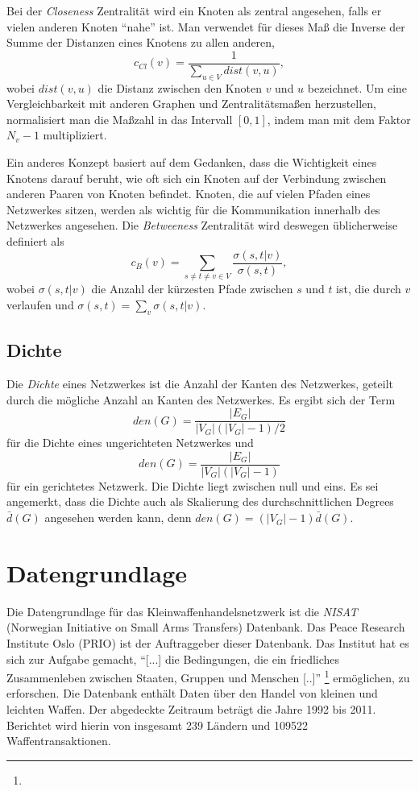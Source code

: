 \documentclass[a4paper,ngerman,oneside,titlepage,bibliography=totoc,11pt]{scrreprt}
\begin{document}
Bei der \emph{Closeness} Zentralität wird ein Knoten als zentral angesehen, falls er vielen anderen Knoten "`nahe"' ist.
Man verwendet für dieses Maß die Inverse der Summe der Distanzen eines Knotens zu allen anderen,
$$ c_{Cl}(v)=\frac{1}{\sum_{u \in V}{dist(v,u)}}, $$
wobei $dist(v,u)$ die Distanz zwischen den Knoten $v$ und $u$ bezeichnet. Um eine Vergleichbarkeit mit anderen Graphen und Zentralitätsmaßen herzustellen, normalisiert man die Maßzahl in das Intervall $[0,1]$, indem man mit dem Faktor $N_v - 1$ multipliziert.

Ein anderes Konzept basiert auf dem Gedanken, dass die Wichtigkeit eines Knotens darauf beruht, wie oft sich ein Knoten auf der Verbindung zwischen anderen Paaren von Knoten befindet. Knoten, die auf vielen Pfaden eines Netzwerkes sitzen, werden als wichtig für die Kommunikation innerhalb des Netzwerkes angesehen. 
Die \emph{Betweeness} Zentralität wird deswegen üblicherweise definiert als
$$ c_{B}(v)= \sum_{s \neq t \neq v \in V} {\frac{\sigma(s,t|v)}{\sigma(s,t)}}, $$
wobei $\sigma(s,t|v)$ die Anzahl der kürzesten Pfade zwischen $s$ und $t$ ist, die durch $v$ verlaufen und $\sigma(s,t) = \sum_v{\sigma(s,t|v)}$.

\section{Dichte}
Die \emph{Dichte} eines Netzwerkes ist die Anzahl der Kanten des Netzwerkes, geteilt durch die mögliche Anzahl an Kanten des Netzwerkes. Es ergibt sich der Term $$den(G) = \frac{|E_G|}{|V_G|(|V_G|-1)/2}$$ für die Dichte eines ungerichteten Netzwerkes und $$den(G) = \frac{|E_G|}{|V_G|(|V_G|-1)}$$ für ein gerichtetes Netzwerk. Die Dichte liegt zwischen null und eins. Es sei angemerkt, dass die Dichte auch als Skalierung des durchschnittlichen Degrees $\bar{d}(G)$ angesehen werden kann, denn $den(G) = (|V_G| - 1) \bar{d}(G)$.

\chapter{Datengrundlage}
Die Datengrundlage für das Kleinwaffenhandelsnetzwerk ist die \emph{NISAT} (Norwegian Initiative on Small Arms Transfers) Datenbank. Das Peace Research Institute Oslo (PRIO) ist der Auftraggeber dieser Datenbank. Das Institut hat es sich zur Aufgabe gemacht, "`[...] die Bedingungen, die ein friedliches Zusammenleben zwischen Staaten, Gruppen und Menschen [..]"' \footnote{} ermöglichen, zu erforschen. Die Datenbank enthält Daten über den Handel von kleinen und leichten Waffen. Der abgedeckte Zeitraum beträgt die Jahre 1992 bis 2011. Berichtet wird hierin von insgesamt 239 Ländern und 109522 Waffentransaktionen.
\end{document}
